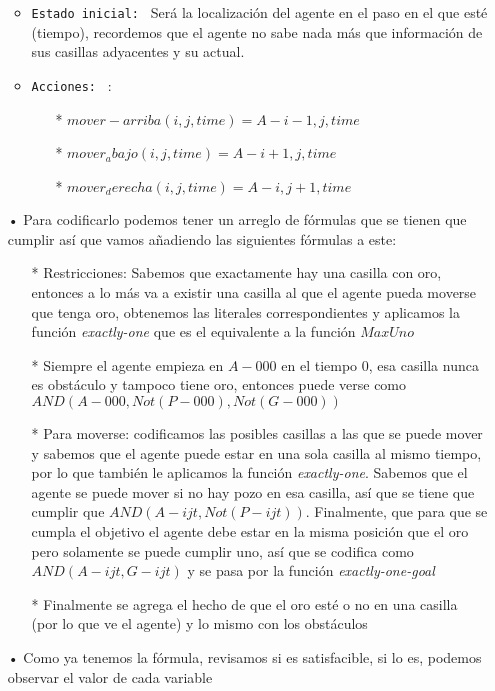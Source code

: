 \documentclass{article}
\begin{document}
\begin{itemize}
\begin{itemize}
\begin{itemize}
		\end{itemize} 		 
		\item \texttt{Estado inicial: } Será la localización del agente en el paso en el que esté (tiempo), recordemos 
		que el agente no sabe nada más que información de sus casillas adyacentes y su actual. 
		\item \texttt{Acciones: } : 
			\begin{itemize}
				\item[*]$mover-arriba(i, j , time) = A-i-1,j,time$
				\item[*]$mover_abajo(i, j, time) = A-i+1,j,time$
				\item[*]$mover_derecha(i,j,time) = A-i,j+1,time$
			\end{itemize}
 	\end{itemize}
 	\item[•] Para codificarlo podemos tener un arreglo de fórmulas que se tienen que cumplir así que vamos añadiendo las siguientes fórmulas a este:  
 		\begin{itemize}
 			\item[*]Restricciones: Sabemos que exactamente hay una casilla con oro, entonces a lo más va a existir una casilla al que el agente pueda moverse que tenga oro, obtenemos las literales correspondientes y aplicamos la función \textit{exactly-one} que es el equivalente a la función $MaxUno$
 			\item[*]Siempre el agente empieza en $A-000$ en el tiempo 0, esa casilla nunca es obstáculo y tampoco tiene oro, entonces puede verse como $AND(A-000, Not(P-000), Not(G-000))$
 			\item[*]Para moverse: codificamos las posibles casillas a las que se puede mover y sabemos que el agente puede estar en una sola casilla al mismo tiempo, por lo que también le aplicamos la función \textit{exactly-one}. Sabemos que el agente se puede mover si no hay pozo en esa casilla, así que se tiene que cumplir que $AND(A-ijt, Not(P-ijt))$. Finalmente, que para que se cumpla el objetivo el agente debe estar en la misma posición que el oro pero solamente se puede cumplir uno, así que se codifica como $AND(A-ijt, G-ijt)$ y se pasa por la función \textit{exactly-one-goal}
 			\item[*]Finalmente se agrega el hecho de que el oro esté o no en una casilla (por lo que ve el agente) y lo mismo con los obstáculos
 			
 		\end{itemize}
 		\item[•]Como ya tenemos la fórmula, revisamos si es satisfacible, si lo es, podemos observar el valor de cada variable
 \end{itemize}
\end{document}
